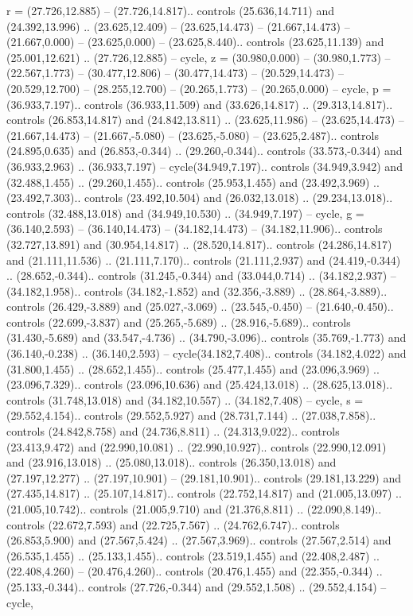 {r} = {(27.726,12.885) -- (27.726,14.817).. controls (25.636,14.711) and (24.392,13.996) .. (23.625,12.409) -- (23.625,14.473) -- (21.667,14.473) -- (21.667,0.000) -- (23.625,0.000) -- (23.625,8.440).. controls (23.625,11.139) and (25.001,12.621) .. (27.726,12.885) -- cycle},
{z} = {(30.980,0.000) -- (30.980,1.773) -- (22.567,1.773) -- (30.477,12.806) -- (30.477,14.473) -- (20.529,14.473) -- (20.529,12.700) -- (28.255,12.700) -- (20.265,1.773) -- (20.265,0.000) -- cycle},
{p} = {(36.933,7.197).. controls (36.933,11.509) and (33.626,14.817) .. (29.313,14.817).. controls (26.853,14.817) and (24.842,13.811) .. (23.625,11.986) -- (23.625,14.473) -- (21.667,14.473) -- (21.667,-5.080) -- (23.625,-5.080) -- (23.625,2.487).. controls (24.895,0.635) and (26.853,-0.344) .. (29.260,-0.344).. controls (33.573,-0.344) and (36.933,2.963) .. (36.933,7.197) -- cycle(34.949,7.197).. controls (34.949,3.942) and (32.488,1.455) .. (29.260,1.455).. controls (25.953,1.455) and (23.492,3.969) .. (23.492,7.303).. controls (23.492,10.504) and (26.032,13.018) .. (29.234,13.018).. controls (32.488,13.018) and (34.949,10.530) .. (34.949,7.197) -- cycle},
{g} = {(36.140,2.593) -- (36.140,14.473) -- (34.182,14.473) -- (34.182,11.906).. controls (32.727,13.891) and (30.954,14.817) .. (28.520,14.817).. controls (24.286,14.817) and (21.111,11.536) .. (21.111,7.170).. controls (21.111,2.937) and (24.419,-0.344) .. (28.652,-0.344).. controls (31.245,-0.344) and (33.044,0.714) .. (34.182,2.937) -- (34.182,1.958).. controls (34.182,-1.852) and (32.356,-3.889) .. (28.864,-3.889).. controls (26.429,-3.889) and (25.027,-3.069) .. (23.545,-0.450) -- (21.640,-0.450).. controls (22.699,-3.837) and (25.265,-5.689) .. (28.916,-5.689).. controls (31.430,-5.689) and (33.547,-4.736) .. (34.790,-3.096).. controls (35.769,-1.773) and (36.140,-0.238) .. (36.140,2.593) -- cycle(34.182,7.408).. controls (34.182,4.022) and (31.800,1.455) .. (28.652,1.455).. controls (25.477,1.455) and (23.096,3.969) .. (23.096,7.329).. controls (23.096,10.636) and (25.424,13.018) .. (28.625,13.018).. controls (31.748,13.018) and (34.182,10.557) .. (34.182,7.408) -- cycle},
{s} = {(29.552,4.154).. controls (29.552,5.927) and (28.731,7.144) .. (27.038,7.858).. controls (24.842,8.758) and (24.736,8.811) .. (24.313,9.022).. controls (23.413,9.472) and (22.990,10.081) .. (22.990,10.927).. controls (22.990,12.091) and (23.916,13.018) .. (25.080,13.018).. controls (26.350,13.018) and (27.197,12.277) .. (27.197,10.901) -- (29.181,10.901).. controls (29.181,13.229) and (27.435,14.817) .. (25.107,14.817).. controls (22.752,14.817) and (21.005,13.097) .. (21.005,10.742).. controls (21.005,9.710) and (21.376,8.811) .. (22.090,8.149).. controls (22.672,7.593) and (22.725,7.567) .. (24.762,6.747).. controls (26.853,5.900) and (27.567,5.424) .. (27.567,3.969).. controls (27.567,2.514) and (26.535,1.455) .. (25.133,1.455).. controls (23.519,1.455) and (22.408,2.487) .. (22.408,4.260) -- (20.476,4.260).. controls (20.476,1.455) and (22.355,-0.344) .. (25.133,-0.344).. controls (27.726,-0.344) and (29.552,1.508) .. (29.552,4.154) -- cycle},
